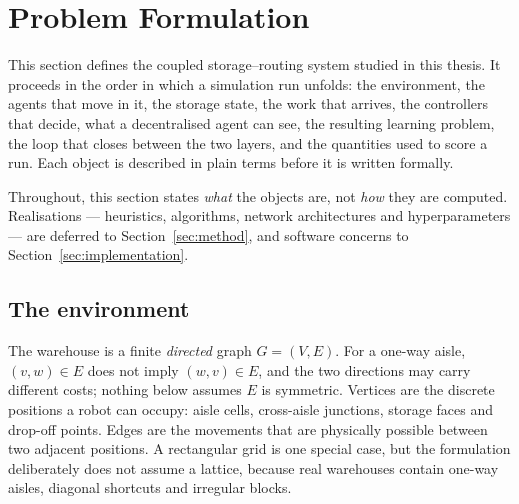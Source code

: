 \documentclass[../main.tex]{subfiles}
\begin{document}
%

\section{Problem Formulation}
\label{sec:problem}

This section defines the coupled storage--routing system studied in this thesis.
It proceeds in the order in which a simulation run unfolds: the environment, the
agents that move in it, the storage state, the work that arrives, the controllers
that decide, what a decentralised agent can see, the resulting learning problem,
the loop that closes between the two layers, and the quantities used to score a
run. Each object is described in plain terms before it is written formally.

Throughout, this section states \emph{what} the objects are, not \emph{how} they
are computed. Realisations --- heuristics, algorithms, network architectures and
hyperparameters --- are deferred to Section~\ref{sec:method}, and software
concerns to Section~\ref{sec:implementation}.

\subsection{The environment}
\label{sec:pf:env}

The warehouse is a finite \emph{directed} graph $G=(V,E)$. %
For a one-way aisle, $(v,w) \in E$ does not imply $(w,v) \in E$, and the two
directions may carry different costs; nothing below assumes $E$ is symmetric.
Vertices are the discrete positions a robot can occupy: aisle cells, cross-aisle
junctions, storage faces and drop-off points. Edges are the movements that are
physically possible between two adjacent positions. A rectangular grid is one
special case, but the formulation deliberately does not assume a lattice,
because real warehouses contain one-way aisles, diagonal shortcuts and irregular
blocks.
\end{document}
